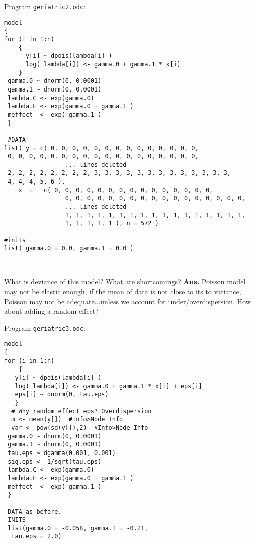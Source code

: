 \documentclass[12pt]{article}
\begin{document}
\vspace*{0.1in}

 Program {\tt geriatric2.odc}:
 
 \begin{verbatim}
model
{
for (i in 1:n)
    {
      y[i] ~ dpois(lambda[i] )
      log( lambda[i]) <- gamma.0 + gamma.1 * x[i]
    }
 gamma.0 ~ dnorm(0, 0.0001)
 gamma.1 ~ dnorm(0, 0.0001)
 lambda.C <- exp(gamma.0)
 lambda.E <- exp(gamma.0 + gamma.1 )
 meffect  <- exp( gamma.1 )
 }
 
 #DATA
list( y = c( 0, 0, 0, 0, 0, 0, 0, 0, 0, 0, 0, 0, 0, 0,
 0, 0, 0, 0, 0, 0, 0, 0, 0, 0, 0, 0, 0, 0, 0, 0, 0, 0, 
                 ... lines deleted
 2, 2, 2, 2, 2, 2, 2, 2, 3, 3, 3, 3, 3, 3, 3, 3, 3, 3, 3, 3, 3,
 4, 4, 4, 5, 6 ),
    x  =   c( 0, 0, 0, 0, 0, 0, 0, 0, 0, 0, 0, 0, 0, 0, 0,  
                 0, 0, 0, 0, 0, 0, 0, 0, 0, 0, 0, 0, 0, 0, 0, 0, 0,  
                 ... lines deleted
                 1, 1, 1, 1, 1, 1, 1, 1, 1, 1, 1, 1, 1, 1, 1, 1, 1,  
                 1, 1, 1, 1, 1 ), n = 572 )

#inits
list( gamma.0 = 0.0, gamma.1 = 0.0 )

 
\end{verbatim}

What is deviance of this model? What are shortcomings?
{\bf Ans.}  Poisson model may not be elastic enough, if the
mean of data is not close to its to variance, Poisson may not be 
adequate...unless we account for under/overdispersion. 
How about adding a random effect?


\vspace*{0.1in}

 Program {\tt geriatric3.odc}:

\begin{verbatim}
model
{
for (i in 1:n)
    {
   y[i] ~ dpois(lambda[i] )
   log( lambda[i]) <- gamma.0 + gamma.1 * x[i] + eps[i]
   eps[i] ~ dnorm(0, tau.eps)
   }
  # Why random effect eps? Overdispersion
  m <- mean(y[])  #Info>Node Info
  var <- pow(sd(y[]),2)  #Info>Node Info
 gamma.0 ~ dnorm(0, 0.0001)
 gamma.1 ~ dnorm(0, 0.0001)
 tau.eps ~ dgamma(0.001, 0.001)
 sig.eps <- 1/sqrt(tau.eps)
 lambda.C <- exp(gamma.0)
 lambda.E <- exp(gamma.0 + gamma.1 )
 meffect  <- exp( gamma.1 )
 }
 
 DATA as before.
 INITS
 list(gamma.0 = -0.058, gamma.1 = -0.21,
  tau.eps = 2.0)
\end{verbatim}
\end{document}
